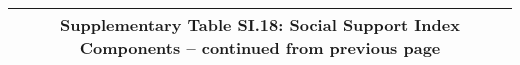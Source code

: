 \begin{longtable}{llcccccccccc}
\multicolumn{12}{c}{{\bfseries Supplementary Table SI.18: Social Support Index Components -- continued from previous page}} \\ \hline                                                                                                                                                                                                                                                                                                                                                                                                                                                                                                                                                                                                                                                                                                                                                     

\end{longtable}
